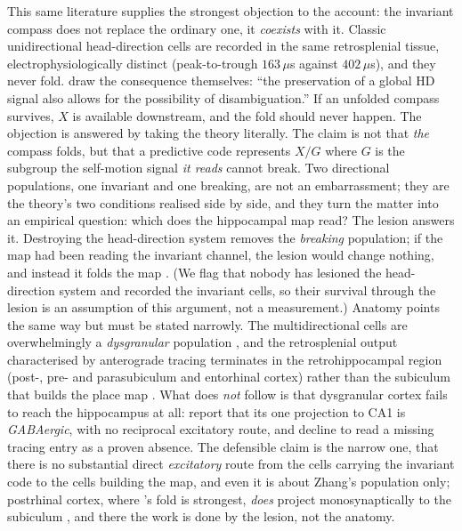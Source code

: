 \documentclass[9pt,lineno]{elife}
\begin{document}
This same literature supplies the strongest objection to the account: the invariant compass does not
replace the ordinary one, it \emph{coexists} with it. Classic unidirectional head-direction cells are
recorded in the same retrosplenial tissue, electrophysiologically distinct (peak-to-trough $163\,\mu$s
against $402\,\mu$s), and they never fold. \citet{zhang2022} draw the consequence themselves: ``the
preservation of a global HD signal also allows for the possibility of disambiguation.'' If an unfolded
compass survives, $X$ is available downstream, and the fold should never happen. The objection is
answered by taking the theory literally. The claim is not that \emph{the} compass folds, but that a
predictive code represents $X/G$ where $G$ is the subgroup the self-motion signal \emph{it reads} cannot
break. Two directional populations, one invariant and one breaking, are not an embarrassment; they are
the theory's two conditions realised side by side, and they turn the matter into an empirical question:
which does the hippocampal map read? The lesion answers it. Destroying the head-direction system removes
the \emph{breaking} population; if the map had been reading the invariant channel, the lesion would
change nothing, and instead it folds the map \citep{harland2017}. (We flag that nobody has lesioned the
head-direction system and recorded the invariant cells, so their survival through the lesion is an
assumption of this argument, not a measurement.) Anatomy points the same way but must be stated
narrowly. The multidirectional cells are overwhelmingly a \emph{dysgranular} population
\citep[$76\%$;][]{zhang2022}, and the retrosplenial output characterised by anterograde tracing
terminates in the retrohippocampal region (post-, pre- and parasubiculum and entorhinal cortex)
rather than the subiculum that builds the place map \citep{shibata1994, vangroen1992}. What does
\emph{not} follow is that dysgranular cortex fails to reach the hippocampus at all: \citet{li2025} report
that its one projection to CA1 is \emph{GABAergic}, with no reciprocal excitatory route, and
\citet{sugar2011} decline to read a missing tracing entry as a proven absence. The defensible claim is
the narrow one, that there is no substantial direct \emph{excitatory} route from the cells carrying the
invariant code to the cells building the map, and even it is about Zhang's population only; postrhinal
cortex,
where \citeauthor{lachance2024}'s fold is strongest, \emph{does} project monosynaptically to the
subiculum \citep{naber2001}, and there the work is done by the lesion, not the anatomy.
\end{document}

